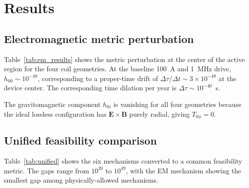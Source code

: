 \documentclass[11pt,a4paper,twocolumn]{article}
\begin{document}
\section{Results}
\label{sec:results}

\subsection{Electromagnetic metric perturbation}
\label{subsec:em_results}

Table~\ref{tab:em_results} shows the metric perturbation at the
center of the active region for the four coil geometries. At the
baseline 100~A and 1~MHz drive, $h_{00} \sim 10^{-48}$, corresponding
to a proper-time drift of $\Delta\tau/\Delta t \sim 3\times 10^{-48}$
at the device center. The corresponding time dilation per year is
$\Delta\tau \sim 10^{-40}$~s.

\begin{table}[t]
\centering
\small
\caption{EM-induced metric perturbation at device center
(baseline 100~A, 1~MHz).}
\label{tab:em_results}
\end{table}


The gravitomagnetic component $h_{0i}$ is vanishing for all four
geometries because the ideal lossless configuration has
$\mathbf{E}\times\mathbf{B}$ purely radial, giving $T_{0\phi}=0$.

\subsection{Unified feasibility comparison}
\label{subsec:unified}

Table~\ref{tab:unified} shows the six mechanisms converted to a
common feasibility metric. The gaps range from $10^{20}$ to $10^{49}$,
with the EM mechanism showing the smallest gap among
physically-allowed mechanisms.
\end{document}
